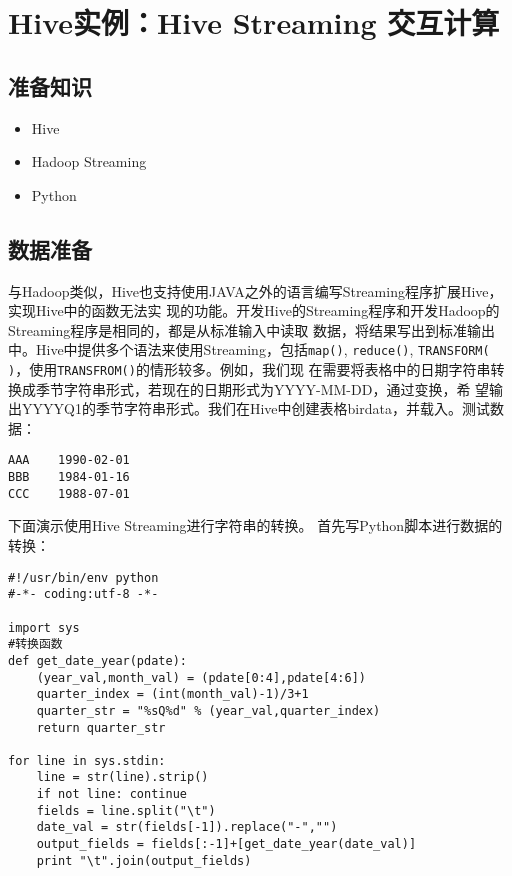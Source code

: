 \section{Hive实例：Hive Streaming 交互计算}\label{ux5b9eux4f8bux5206ux6790hadoop-streaming-ux4e0e-hive-ux4ea4ux4e92ux8ba1ux7b97ux5b9eux4f8b}

\subsection{准备知识}\label{ux51c6ux5907ux77e5ux8bc6}

\begin{itemize}
\itemsep1pt\parskip0pt
\item
  Hive
\item
  Hadoop Streaming
\item
  Python
\end{itemize}

\subsection{数据准备}\label{ux6570ux636eux51c6ux5907}

与Hadoop类似，Hive也支持使用JAVA之外的语言编写Streaming程序扩展Hive，实现Hive中的函数无法实
现的功能。开发Hive的Streaming程序和开发Hadoop的Streaming程序是相同的，都是从标准输入中读取
数据，将结果写出到标准输出中。Hive中提供多个语法来使用Streaming，包括\texttt{map()},
\texttt{reduce()}, \texttt{TRANSFORM( )}，使用\texttt{TRANSFROM()}的情形较多。例如，我们现
在需要将表格中的日期字符串转换成季节字符串形式，若现在的日期形式为YYYY-MM-DD，通过变换，希
望输出YYYYQ1的季节字符串形式。我们在Hive中创建表格birdata，并载入。测试数据：

\begin{lstlisting}
AAA    1990-02-01
BBB    1984-01-16
CCC    1988-07-01
\end{lstlisting}

下面演示使用Hive Streaming进行字符串的转换。
首先写Python脚本进行数据的转换：

\begin{lstlisting}
#!/usr/bin/env python
#-*- coding:utf-8 -*-

import sys
#转换函数
def get_date_year(pdate):
    (year_val,month_val) = (pdate[0:4],pdate[4:6])
    quarter_index = (int(month_val)-1)/3+1
    quarter_str = "%sQ%d" % (year_val,quarter_index)
    return quarter_str

for line in sys.stdin:
    line = str(line).strip()
    if not line: continue
    fields = line.split("\t")
    date_val = str(fields[-1]).replace("-","")
    output_fields = fields[:-1]+[get_date_year(date_val)]
    print "\t".join(output_fields)
\end{lstlisting}

